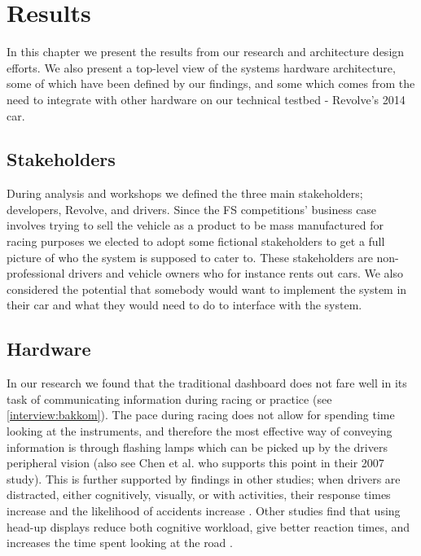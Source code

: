 


\chapter{Results}
\label{chapter:results}

In this chapter we present the results from our research and architecture design efforts. We also present a top-level view of the systems hardware
architecture, some of which have been defined by our findings, and some which
comes from the need to integrate with other hardware on our technical testbed -
Revolve's 2014 car. 

\section{Stakeholders}
\label{results:stakeholders}
During analysis and workshops we defined the three main stakeholders;
developers, Revolve, and drivers. Since the FS competitions' business case
involves trying to sell the vehicle as a product to be mass manufactured for
racing purposes we elected to adopt some fictional stakeholders to get a full
picture of who the system is supposed to cater to. These stakeholders are
non-professional drivers and vehicle owners who for instance rents out cars. We
also considered the potential that somebody would want to implement the system
in their car and what they would need to do to interface with the system.

\section{Hardware}
In our research we found that the traditional dashboard does not fare well in
its task of communicating information during racing or practice (see \vref{interview:bakkom}).
The pace during racing does not allow for spending time looking at the
instruments, and therefore the most effective way of conveying information is
through flashing lamps which can be picked up by the drivers peripheral vision
(also see Chen et al. \cite{cheng2007intelligentVehicles} who supports this 
point in their 2007 study).
This is further supported by findings in other studies; when drivers are
distracted, either cognitively, visually, or with activities, their response
times increase and the likelihood of accidents increase \cite{hancock1999effects,visualDistractionsStudy}.
Other studies find that using head-up displays reduce both cognitive workload, give better reaction times, and increases the time spent looking at the
road
\cite{BMW,huang2013effects,Liu:HudPerformance,nishizawa1997heads,cheng2007intelligentVehicles,lim1999heads}.

